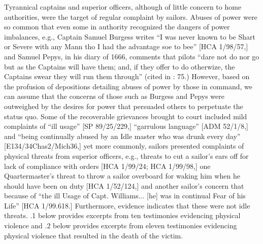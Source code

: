 Tyrannical captains and superior officers, although of little concern to home authorities, were the target of regular complaint by sailors. Abuses of power were so common that even some in authority recognized the dangers of power imbalances, e.g., Captain Samuel Burgess writes “I was never known to be Shart or Severe with any Mann tho I had the advantage soe to bee” [HCA 1/98/57,] and Samuel Pepys, in his diary of 1666, comments that pilots “dare not do nor go but as the Captains will have them; and, if they offer to do otherwize, the Captains swear they will run them through” (cited in \citealt{Lavery2009}: 75.) However, based on the profusion of depositions detailing abuses of power by those in command, we can assume that the concerns of those such as Burgess and Pepys were outweighed by the desires for power that persuaded others to perpetuate the status quo. Some of the recoverable grievances brought to court included mild complaints of “ill usage” [SP 89/25/229,] “garrulous language” [ADM 52/1/8,] and “being continually abused by an Idle master who was drunk every day” [E134/34Chas2/Mich36,] yet more commonly, sailors presented complaints of physical threats from superior officers, e.g., threats to cut a sailor’s ears off for lack of compliance with orders [HCA 1/99/24; HCA 1/99/98,] one Quartermaster’s threat to throw a sailor overboard for waking him when he should have been on duty [HCA 1/52/124,] and another sailor’s concern that because of “the ill Usage of Capt. Williams... [he] was in continual Fear of his Life” [HCA 1/99.618.] Furthermore, evidence indicates that these were not idle threats. .1 below provides excerpts from ten testimonies evidencing physical violence and .2 below provides excerpts from eleven testimonies evidencing physical violence that resulted in the death of the victim.


